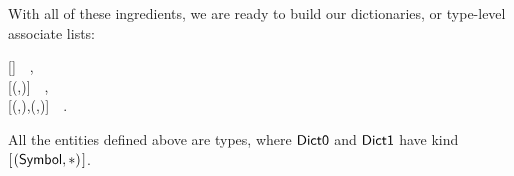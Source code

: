 With all of these ingredients, we are ready to build our dictionaries, or
type-level associate lists:
\begin{hscode}\SaveRestoreHook
{}%
%
\>[B]{}\;\mathrel{=}\mbox{\textquotesingle}[]~~,{}\<[E]%
\\
\>[B]{}\;\mathrel{=}\mbox{\textquotesingle}[\mbox{\textquotesingle}(,)]~~,{}\<[E]%
\\
\>[B]{}\;\mathrel{=}\mbox{\textquotesingle}[\mbox{\textquotesingle}(,),\mbox{\textquotesingle}(,)]~~.{}\<[E]%
\ColumnHook
\end{hscode}\resethooks
All the entities defined above are types, where \ensuremath{\Conid{Dict0}} and \ensuremath{\Conid{Dict1}}
have kind \ensuremath{[\mskip1.5mu (\Conid{Symbol},\mathbin{*})\mskip1.5mu]}.
